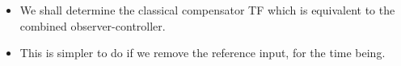 \begin{itemize}
	\item We shall determine the classical compensator TF which is equivalent to the combined observer-controller. 
	\item This is simpler to do if we remove the reference input, for the time being.
\end{itemize}
\begin{center}
\end{center}
\endinput

